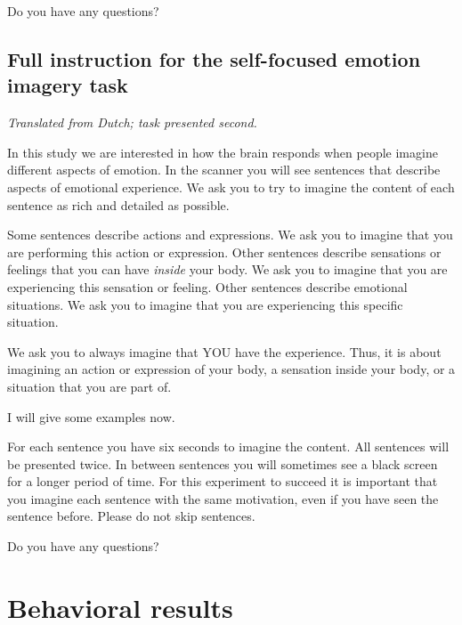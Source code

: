 \documentclass[12pt,american,a4paper,oneside,]{memoir} %
\begin{document}
Do you have any questions?

\hypertarget{full-instruction-for-the-self-focused-emotion-imagery-task}{%
\subsection{Full instruction for the self-focused emotion imagery task}\label{full-instruction-for-the-self-focused-emotion-imagery-task}}

\emph{Translated from Dutch; task presented second.}

In this study we are interested in how the brain responds when people imagine different aspects of emotion. In the scanner you will see sentences that describe aspects of emotional experience. We ask you to try to imagine the content of each sentence as rich and detailed as possible.

Some sentences describe actions and expressions. We ask you to imagine that you are performing this action or expression. Other sentences describe sensations or feelings that you can have \emph{inside} your body. We ask you to imagine that you are experiencing this sensation or feeling. Other sentences describe emotional situations. We ask you to imagine that you are experiencing this specific situation.

We ask you to always imagine that YOU have the experience. Thus, it is about imagining an action or expression of your body, a sensation inside your body, or a situation that you are part of.

I will give some examples now.

For each sentence you have six seconds to imagine the content. All sentences will be presented twice. In between sentences you will sometimes see a black screen for a longer period of time. For this experiment to succeed it is important that you imagine each sentence with the same motivation, even if you have seen the sentence before. Please do not skip sentences.

Do you have any questions?

\newpage
\pagestyle{empty}

\hypertarget{behavioral-results}{%
\section{Behavioral results}\label{behavioral-results}}

\end{document}

